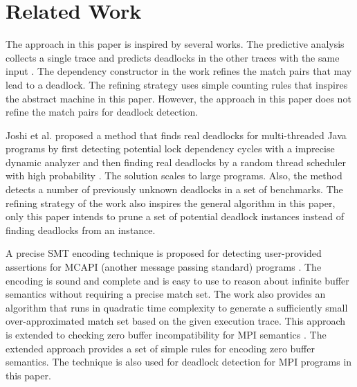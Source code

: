 \section{Related Work}
The approach in this paper is inspired by several works. The predictive analysis collects a single trace and predicts deadlocks in the other traces with the same input  \cite{DBLP:conf/sc/SharmaGB12,Subodh:Dissertation}. The dependency constructor in the work refines the match pairs that may lead to a deadlock. The refining strategy uses simple counting rules that inspires the abstract machine in this paper. However, the approach in this paper does not refine the match pairs for deadlock detection.

Joshi et al. proposed a method that finds real deadlocks for multi-threaded Java programs by first detecting potential lock dependency cycles with a imprecise dynamic analyzer and then finding real deadlocks by a random thread scheduler with high probability \cite{DBLP:conf/pldi/JoshiPSN09}. The solution scales to large programs. Also, the method detects a number of previously unknown deadlocks in a set of benchmarks. The refining strategy of the work also inspires the general algorithm in this paper, only this paper intends to prune a set of potential deadlock instances instead of finding deadlocks from an instance.

A precise SMT encoding technique is proposed for detecting user-provided assertions for MCAPI (another message passing standard) programs \cite{DBLP:conf/kbse/HuangMM13}. The encoding is sound and complete and is easy to use to reason about infinite buffer semantics without requiring a precise match set. The work also provides an algorithm that runs in quadratic time complexity to generate a sufficiently small over-approximated match set based on the given execution trace. This approach is extended to checking zero buffer incompatibility for MPI semantics \cite{HuangNFM15}. The extended approach provides a set of simple rules for encoding zero buffer semantics. The technique is also used for deadlock detection for MPI programs in this paper.


